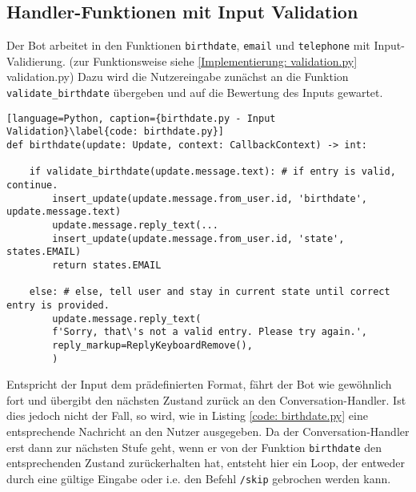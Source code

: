         \subsection{Handler-Funktionen mit Input Validation} \label{Implementierung: handler validation}
            Der Bot arbeitet in den Funktionen \verb|birthdate|, \verb|email| und \verb|telephone| mit Input-Validierung. (zur Funktionsweise siehe \ref{Implementierung: validation.py} validation.py) Dazu wird die Nutzereingabe zunächst an die Funktion \verb|validate_birthdate| übergeben und auf die Bewertung des Inputs gewartet. 
            \begin{lstlisting}[language=Python, caption={birthdate.py - Input Validation}\label{code: birthdate.py}]
def birthdate(update: Update, context: CallbackContext) -> int:

    if validate_birthdate(update.message.text): # if entry is valid, continue.
        insert_update(update.message.from_user.id, 'birthdate', update.message.text)
        update.message.reply_text(...
        insert_update(update.message.from_user.id, 'state', states.EMAIL)
        return states.EMAIL

    else: # else, tell user and stay in current state until correct entry is provided.
        update.message.reply_text(
        f'Sorry, that\'s not a valid entry. Please try again.',
        reply_markup=ReplyKeyboardRemove(),
        )
            \end{lstlisting}
                
            Entspricht der Input dem prädefinierten Format, fährt der Bot wie gewöhnlich fort und übergibt den nächsten Zustand zurück an den Conversation-Handler. Ist dies jedoch nicht der Fall, so wird, wie in Listing \ref*{code: birthdate.py} eine entsprechende Nachricht an den Nutzer ausgegeben. Da der Conversation-Handler erst dann zur nächsten Stufe geht, wenn er von der Funktion \verb|birthdate| den entsprechenden Zustand zurückerhalten hat, entsteht hier ein Loop, der entweder durch eine gültige Eingabe oder i.e. den Befehl \verb|/skip| gebrochen werden kann.
        
            

